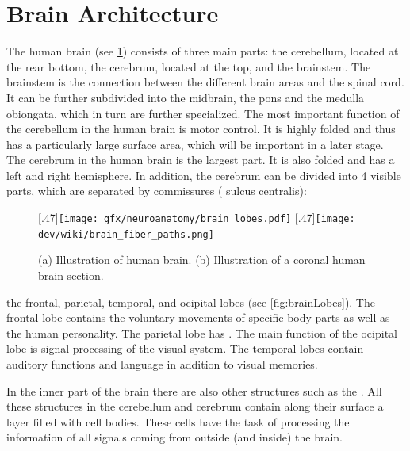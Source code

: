\section{Brain Architecture}
%
The human brain (see \cref{fig:humanBrain}) consists of three main parts: the cerebellum, located at the rear bottom, the cerebrum, located at the top, and the brainstem.
The brainstem is the connection between the different brain areas and the spinal cord.
It can be further subdivided into the midbrain, the pons and the medulla obiongata, which in turn are further specialized.
The most important function of the cerebellum in the human brain is motor control.
It is highly folded and thus has a particularly large surface area, which will be important in a later stage.
\\
%
The cerebrum in the human brain is the largest part.
It is also folded and has a left and right hemisphere.
In addition, the cerebrum can be divided into 4 visible parts, which are separated by commissures (\eg{} sulcus centralis):
%
\begin{figure}[!t]
\centering
[.47\textwidth]{\texttt{[image: gfx/neuroanatomy/brain\_lobes.pdf]}}
\hspace*{\fill}
[.47\textwidth]{\texttt{[image: dev/wiki/brain\_fiber\_paths.png]}}
\caption{(a) Illustration of human brain. (b) Illustration of a coronal human brain section. }
\label{fig:humanBrain}
\end{figure}
%
the frontal, parietal, temporal, and ocipital lobes (see \cref{fig:brainLobes}).
The frontal lobe contains the voluntary movements of specific body parts as well as the human personality.
The parietal lobe has \dummy{}.
The main function of the ocipital lobe is signal processing of the visual system.
The temporal lobes contain auditory functions and language in addition to visual memories.
\par
%
In the inner part of the brain there are also other structures such as the \dummy{}.
All these structures in the cerebellum and cerebrum contain along their surface a layer filled with cell bodies.
These cells have the task of processing the information of all signals coming from outside (and inside) the brain.
